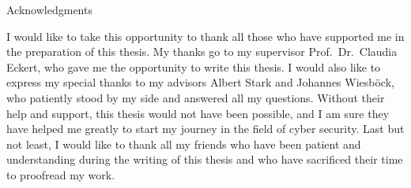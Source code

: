 \thispagestyle{empty}

\vspace*{20mm}

\begin{center}
    { Acknowledgments}
\end{center}

\vspace{10mm}

I would like to take this opportunity to thank all those who have supported me in the preparation of this thesis.
My thanks go to my supervisor Prof.\ Dr.\ Claudia Eckert, who gave me the opportunity to write this thesis.
I would also like to express my special thanks to my advisors Albert Stark and Johannes Wiesböck, who patiently stood by my side and answered all my questions.
Without their help and support, this thesis would not have been possible, and I am sure they have helped me greatly to start my journey in the field of cyber security.
Last but not least, I would like to thank all my friends who have been patient and understanding during the writing of this thesis and who have sacrificed their time to proofread my work.


\cleardoublepage{}
